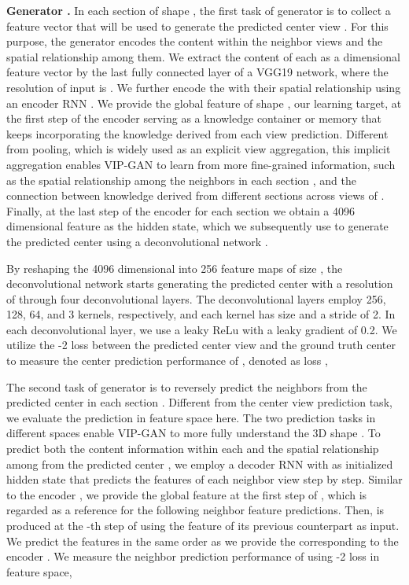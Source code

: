 \documentclass[letterpaper]{article} \usepackage{aaai19}  \usepackage{times}  \usepackage{helvet}  \usepackage{courier}  \usepackage{url}  \usepackage{graphicx}
\begin{document}
\noindent\textbf{Generator . }In each section  of shape , the first task of generator  is to collect a feature vector  that will be used to generate the predicted center view . For this purpose, the generator encodes the content within the neighbor views  and the spatial relationship among them. We extract the content of each  as a  dimensional feature vector  by the last fully connected layer of a VGG19 network, where the resolution of input  is . We further encode the  with their spatial relationship using an encoder RNN . We provide the global feature  of shape , our learning target, at the first step of the encoder  serving as a knowledge container or memory that keeps incorporating the knowledge derived from each view prediction. Different from pooling, which is widely used as an explicit view aggregation, this implicit aggregation enables VIP-GAN to learn from more fine-grained information,
such as the spatial relationship among the neighbors  in each section , and the connection between knowledge derived from different sections  across  views of . Finally, at the last step of the encoder  for each section  we obtain a 4096 dimensional feature  as the hidden state, which we subsequently use to generate the predicted center  using a deconvolutional network .

By reshaping the 4096 dimensional  into 256 feature maps of size , the deconvolutional network  starts generating the predicted center  with a resolution of  through four deconvolutional layers. The deconvolutional layers employ 256, 128, 64, and 3 kernels, respectively, and each kernel has size  and a stride of 2. In each deconvolutional layer, we use a leaky ReLu with a leaky gradient of 0.2.
We utilize the -2 loss between the predicted center view  and the ground truth center  to measure the center prediction performance of ,
denoted as loss ,


The second task of generator  is to reversely predict the neighbors  from the predicted center  in each section . Different from the center view prediction task,
we evaluate the prediction in feature space here.
The two prediction tasks in different spaces enable VIP-GAN to more fully understand the 3D shape . To predict both the content information within each  and the spatial relationship among  from the predicted center , we employ a decoder RNN  with  as initialized hidden state that predicts the features  of each neighbor view  step by step.
Similar to the encoder , we provide the global feature  at the first step of , which is regarded as a reference for the following neighbor feature predictions. Then,  is produced at the -th step of  using the feature  of its previous counterpart as input. We predict the features  in the same order as we provide the corresponding  to the encoder . We measure the neighbor prediction performance of  using -2 loss in feature space,
\end{document}
